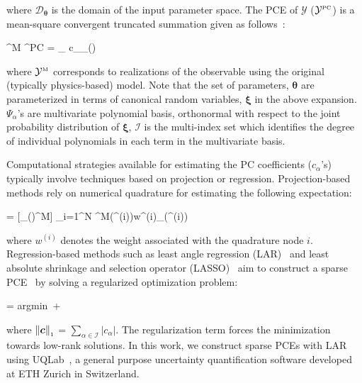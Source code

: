 \noindent where $\mathcal{D}_{\bm{\theta}}$ is the domain of the input parameter space. The PCE of
$\mathcal{Y}$ ($\mathcal{Y}^{\mbox{\tiny {PC}}}$) is a mean-square 
convergent truncated summation given as
follows~\cite{Xiu:2002,Ghanem:2003,Olivier:2010}:

\be
{}^{\mbox{\tiny M}} \approx {}^{\mbox{\tiny PC}} = 
\sum_{\alpha\in{}} c_{\alpha}\Psi_{\alpha}(\bm{\xi(\theta)}) 
\ee

\noindent where $\mathcal{Y}^{\mbox{\tiny M}}$ corresponds to realizations of the
observable using the original (typically physics-based) model. 
Note that the set of parameters, $\bm{\theta}$ are parameterized in terms of canonical random
variables, $\bm{\xi}$ in the above expansion. $\Psi_{\alpha}$'s are multivariate polynomial
basis, orthonormal with respect to the joint probability distribution of $\bm{\xi}$, $\mathcal{I}$
is the multi-index set which identifies the degree of individual polynomials in each term in the
multivariate basis.

Computational strategies available for estimating the PC coefficients ($c_\alpha$'s) typically involve
techniques based on projection or regression. Projection-based methods rely on numerical
quadrature for estimating the following expectation:

\be
{} = [\Psi_\alpha(\bm{\xi})\cdot{}^{\mbox{\tiny{M}}}]
\approx
\sum_{i=1}^{N} ^{\mbox{\tiny{M}}}(\bm{\theta}^{(i)})w^{(i)}\Psi_\alpha(\bm{\xi}^{(i)})
\ee

\noindent where $w^{(i)}$ denotes the weight associated with the quadrature node $i$. 
Regression-based methods such as least angle regression (LAR)~\cite{Efron:2004} and least absolute shrinkage
and selection operator (LASSO)~\cite{Tibshirani:1996} aim to construct a sparse PCE~\cite{Blatman:2008}
by solving a regularized optimization problem:

\be
{} = \mbox{argmin}~  + \lambda{}
\ee

\noindent where $\left\| {\bm{c}} \right\|_{\scriptscriptstyle 1}$ = $\sum_{\alpha\in \mathcal{I}} |c_\alpha |$.
The regularization term forces the minimization towards low-rank solutions.
In this work, we construct sparse PCEs with LAR using UQLab~\cite{Marelli:2014},
a general purpose uncertainty quantification software developed at ETH Zurich in Switzerland.


















